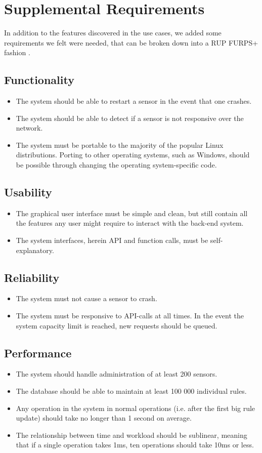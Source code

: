 \section{Supplemental Requirements}
In addition to the features discovered in the use cases, we added some
requirements we felt were needed, that can be broken down into a RUP
FURPS+ fashion \cite{FURPS}.
\subsection{Functionality}
	\begin{itemize}
		\item The system should be able to restart a \snort{} sensor in the event that
		one crashes.
		\item The system should be able to detect if a \snort{} sensor is not responsive
		over the network.
		\item The system must be portable to the majority of the popular Linux
		distributions. Porting to other operating systems, such as Windows, should be
		possible through changing the operating system-specific code.
	\end{itemize}
\subsection{Usability}
	\begin{itemize}
		\item The graphical user interface must be simple and clean, but still contain
		all the features any user might require to interact with the back-end system.
		\item The system interfaces, herein API and function calls, must be
		self-explanatory.
	\end{itemize}
\subsection{Reliability}
	\begin{itemize}
		\item The system must not cause a \snort{} sensor to crash.
		\item The system must be responsive to API-calls at all times. In the event
		the system capacity limit is reached, new requests should be queued.
	\end{itemize}
\subsection{Performance}
	\begin{itemize}
		\item The system should handle administration of at least 200 sensors.
		\item The database should be able to maintain at least 100 000 individual rules.
		\item Any operation in the system in normal operations (i.e. after the first big
		rule update) should take no longer than 1 second on average.
		\item The relationship between time and workload should be sublinear, meaning
		that if a single operation takes 1ms, ten operations should take 10ms or less.
	\end{itemize}
